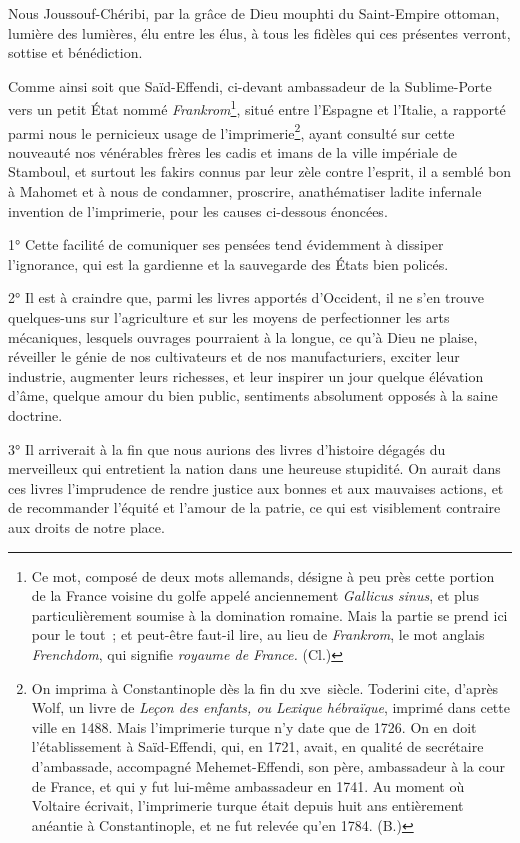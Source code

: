 \documentclass[french,twoside]{book} %
\begin{document}
  \noindent Nous Joussouf-Chéribi, par la grâce de Dieu mouphti du Saint-Empire ottoman, lumière des lumières, élu entre les élus, à tous les fidèles qui ces présentes verront, sottise et bénédiction.\par
Comme ainsi soit que Saïd-Effendi, ci-devant ambassadeur de la Sublime-Porte vers un petit État nommé \emph{Frankrom}\footnote{Ce mot, composé de deux mots allemands, désigne à peu près cette portion de la France voisine du golfe appelé anciennement \emph{Gallicus sinus}, et plus particulièrement soumise à la domination romaine. Mais la partie se prend ici pour le tout ; et peut-être faut-il lire, au lieu de \emph{Frankrom}, le mot anglais \emph{Frenchdom}, qui signifie \emph{royaume de France.} (Cl.)}, situé entre l’Espagne et l’Italie, a rapporté parmi nous le pernicieux usage de l’imprimerie\footnote{On imprima à Constantinople dès la fin du xve siècle. Toderini cite, d’après Wolf, un livre de \emph{Leçon des enfants, ou Lexique hébraïque}, imprimé dans cette ville en 1488. Mais l’imprimerie turque n’y date que de 1726. On en doit l’établissement à Saïd-Effendi, qui, en 1721, avait, en qualité de secrétaire d’ambassade, accompagné Mehemet-Effendi, son père, ambassadeur à la cour de France, et qui y fut lui-même ambassadeur en 1741. Au moment où Voltaire écrivait, l’imprimerie turque était depuis huit ans entièrement anéantie à Constantinople, et ne fut relevée qu’en 1784. (B.)}, ayant consulté sur cette nouveauté nos vénérables frères les cadis et imans de la ville impériale de Stamboul, et surtout les fakirs connus par leur zèle contre l’esprit, il a semblé bon à Mahomet et à nous de condamner, proscrire, anathématiser ladite infernale invention de l’imprimerie, pour les causes ci-dessous énoncées.\par
1° Cette facilité de comuniquer ses pensées tend évidemment à dissiper l’ignorance, qui est la gardienne et la sauvegarde des États bien policés.\par
2° Il est à craindre que, parmi les livres apportés d’Occident, il ne s’en trouve quelques-uns sur l’agriculture et sur les moyens de perfectionner les arts mécaniques, lesquels ouvrages pourraient à la longue, ce qu’à Dieu ne plaise, réveiller le génie de nos cultivateurs et de nos manufacturiers, exciter leur industrie, augmenter leurs richesses, et leur inspirer un jour quelque élévation d’âme, quelque amour du bien public, sentiments absolument opposés à la saine doctrine.\par
3° Il arriverait à la fin que nous aurions des livres d’histoire dégagés du merveilleux qui entretient la nation dans une heureuse stupidité. On aurait dans ces livres l’imprudence de rendre justice aux bonnes et aux mauvaises actions, et de recommander l’équité et l’amour de la patrie, ce qui est visiblement contraire aux droits de notre place.\par
\end{document}
